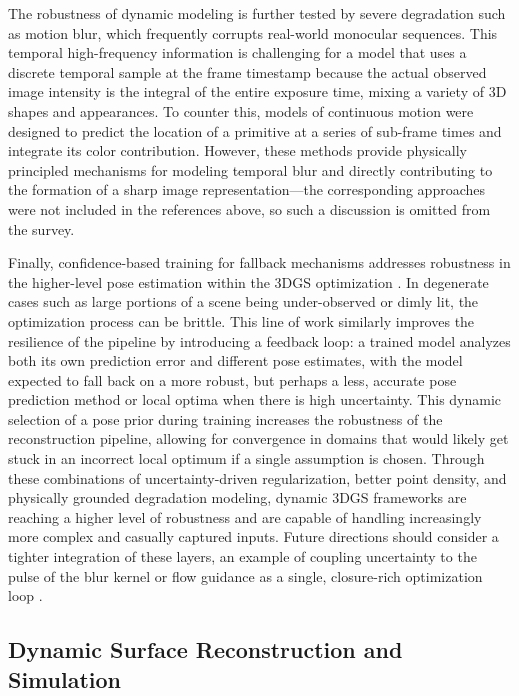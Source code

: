 \documentclass[11pt,a4paper]{article}
\begin{document}
The robustness of dynamic modeling is further tested by severe degradation such as motion blur, which frequently corrupts real-world monocular sequences. This temporal high-frequency information is challenging for a model that uses a discrete temporal sample at the frame timestamp because the actual observed image intensity is the integral of the entire exposure time, mixing a variety of 3D shapes and appearances. To counter this, models of continuous motion were designed to predict the location of a primitive at a series of sub-frame times and integrate its color contribution. However, these methods provide physically principled mechanisms for modeling temporal blur and directly contributing to the formation of a sharp image representation---the corresponding approaches were not included in the references above, so such a discussion is omitted from the survey.

Finally, confidence-based training for fallback mechanisms addresses robustness in the higher-level pose estimation within the 3DGS optimization \cite{arxiv:2607.03209v1}. In degenerate cases such as large portions of a scene being under-observed or dimly lit, the optimization process can be brittle. This line of work similarly improves the resilience of the pipeline by introducing a feedback loop: a trained model analyzes both its own prediction error and different pose estimates, with the model expected to fall back on a more robust, but perhaps a less, accurate pose prediction method or local optima when there is high uncertainty. This dynamic selection of a pose prior during training increases the robustness of the reconstruction pipeline, allowing for convergence in domains that would likely get stuck in an incorrect local optimum if a single assumption is chosen. Through these combinations of uncertainty-driven regularization, better point density, and physically grounded degradation modeling, dynamic 3DGS frameworks are reaching a higher level of robustness and are capable of handling increasingly more complex and casually captured inputs. Future directions should consider a tighter integration of these layers, an example of coupling uncertainty to the pulse of the blur kernel or flow guidance as a single, closure-rich optimization loop \cite{arxiv:2506.02751v3}.


\subsection{Dynamic Surface Reconstruction and Simulation}
\end{document}
